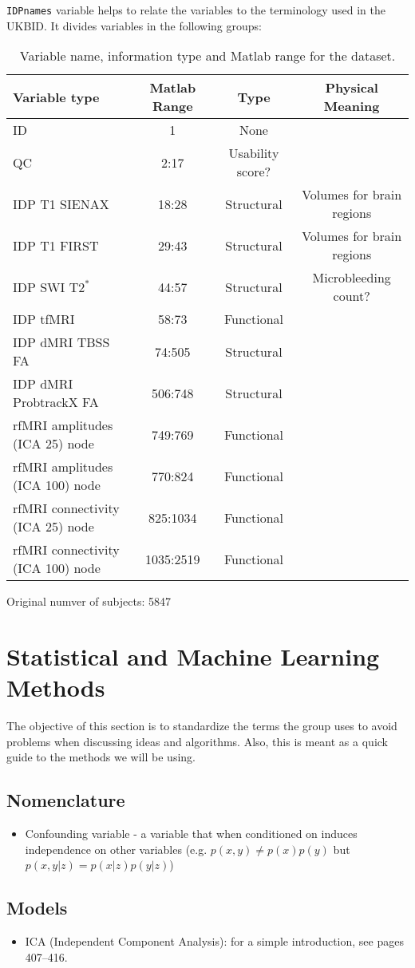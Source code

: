 \documentclass{article}
\begin{document}
{\tt IDPnames} variable helps to relate the variables to the terminology used in the UKBID. It divides variables in the following groups:
\begin{table}
  \begin{tabular}{lccc}
    \toprule
    {\bf Variable type} & {\bf Matlab Range} & {\bf Type} &{\bf Physical Meaning}\\
    \midrule
    ID  & 1 & None \\
    QC  & 2:17 & Usability score?\\
    IDP T1 SIENAX & 18:28 & Structural & Volumes for brain regions\\
    IDP T1 FIRST & 29:43 & Structural & Volumes for brain regions\\
    IDP SWI $\text{T2}^{*}$ & 44:57 & Structural & Microbleeding count?\\
    IDP tfMRI & 58:73 & Functional & \\
    IDP dMRI TBSS FA & 74:505 & Structural & \\
    IDP dMRI ProbtrackX FA & 506:748 & Structural & \\
    rfMRI amplitudes (ICA 25) node    & 749:769 & Functional &\\
    rfMRI amplitudes (ICA 100) node   & 770:824 & Functional &\\
    rfMRI connectivity (ICA 25) node  & 825:1034 & Functional &\\
    rfMRI connectivity (ICA 100) node & 1035:2519 & Functional &\\
    \bottomrule
  \end{tabular}
  \caption{Variable name, information type and  Matlab range for the dataset.}
  \label{tab:data-ranges}
\end{table}
Original numver of subjects: 5847

\section{Statistical and Machine Learning Methods\label{sec:methods}}

The objective of this section is to standardize the terms the group uses to avoid problems when discussing ideas and algorithms. Also, this is meant as a quick guide to the methods we will be using.

\subsection{Nomenclature\label{sec:method-nomen}}
\begin{itemize}
\item Confounding variable - a variable that when conditioned on induces independence on other variables (e.g. $p(x,y)\neq p(x)p(y)$ but $p(x,y|z) = p(x|z)p(y|z)$)
\end{itemize}


\subsection{Models\label{models}}
\begin{itemize}
\item ICA (Independent Component Analysis): for a simple introduction, see \cite{murphy2012} pages 407--416.
\end{itemize}



\end{document}
